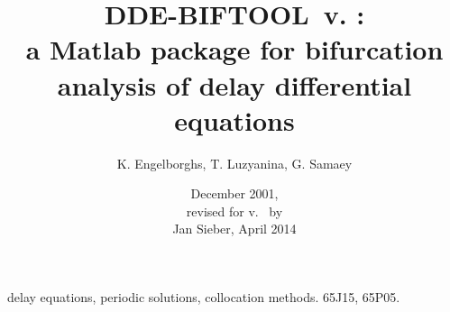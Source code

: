 %


\gdef \DDEBIFCODE{{DDE-BIFTOOL}}

\title{{\DDEBIFCODE\ v. \version{}}:\\
  a Matlab package  for bifurcation analysis
          of delay differential equations} 

\author{K. Engelborghs, T. Luzyanina, G. Samaey}   

\date{December 2001, \\[2ex]
revised for v.~\version{} by\\ Jan Sieber,  April 2014}



\begin{coverpage}

\begin{abstract}
\begin{quotation}             

\end{quotation}
\end{abstract}

\keywords delay equations, periodic solutions, collocation methods.   
\AMS \Primary 65J15,            %
     \Secondary 65P05.          %

\end{coverpage}



